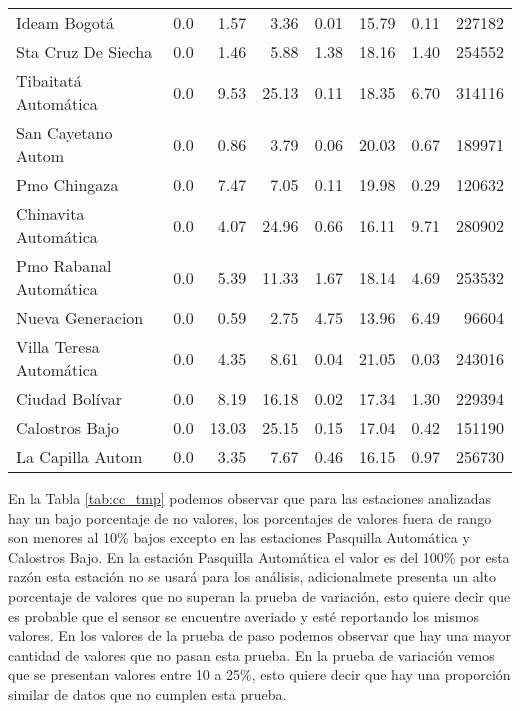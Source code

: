 \begin{enumerate}
\begin{landscape}
\begin{longtable}{p{5cm}rrrrrrr}
            Ideam Bogotá &        0.0 &      1.57 &           3.36 &     0.01 &      15.79 &          0.11 &       227182 \\
      Sta Cruz De Siecha &        0.0 &      1.46 &           5.88 &     1.38 &      18.16 &          1.40 &       254552 \\
    Tibaitatá Automática &        0.0 &      9.53 &          25.13 &     0.11 &      18.35 &          6.70 &       314116 \\
      San Cayetano Autom &        0.0 &      0.86 &           3.79 &     0.06 &      20.03 &          0.67 &       189971 \\
            Pmo Chingaza &        0.0 &      7.47 &           7.05 &     0.11 &      19.98 &          0.29 &       120632 \\
    Chinavita Automática &        0.0 &      4.07 &          24.96 &     0.66 &      16.11 &          9.71 &       280902 \\
  Pmo Rabanal Automática &        0.0 &      5.39 &          11.33 &     1.67 &      18.14 &          4.69 &       253532 \\
        Nueva Generacion &        0.0 &      0.59 &           2.75 &     4.75 &      13.96 &          6.49 &        96604 \\
 Villa Teresa Automática &        0.0 &      4.35 &           8.61 &     0.04 &      21.05 &          0.03 &       243016 \\
          Ciudad Bolívar &        0.0 &      8.19 &          16.18 &     0.02 &      17.34 &          1.30 &       229394 \\
          Calostros Bajo &        0.0 &     13.03 &          25.15 &     0.15 &      17.04 &          0.42 &       151190 \\
        La Capilla Autom &        0.0 &      3.35 &           7.67 &     0.46 &      16.15 &          0.97 &       256730 \\
\end{longtable}
\end{landscape}

En la Tabla \ref{tab:cc_tmp} podemos observar que para las estaciones analizadas hay un bajo porcentaje de no valores, los porcentajes de valores fuera de rango son menores al 10\% bajos excepto en las estaciones Pasquilla Automática y Calostros Bajo. En la estación Pasquilla Automática el valor es del 100\% por esta razón esta estación no se usará para los análisis, adicionalmete presenta un alto porcentaje de valores que no superan la prueba de variación, esto quiere decir que es probable que el sensor se encuentre averiado y esté reportando los mismos valores. En los valores de la prueba de paso podemos observar que hay una mayor cantidad de valores que no pasan esta prueba. En la prueba de variación vemos que se presentan valores entre 10 a 25\%, esto quiere decir que hay una proporción similar de datos que no cumplen esta prueba.

\end{enumerate}

